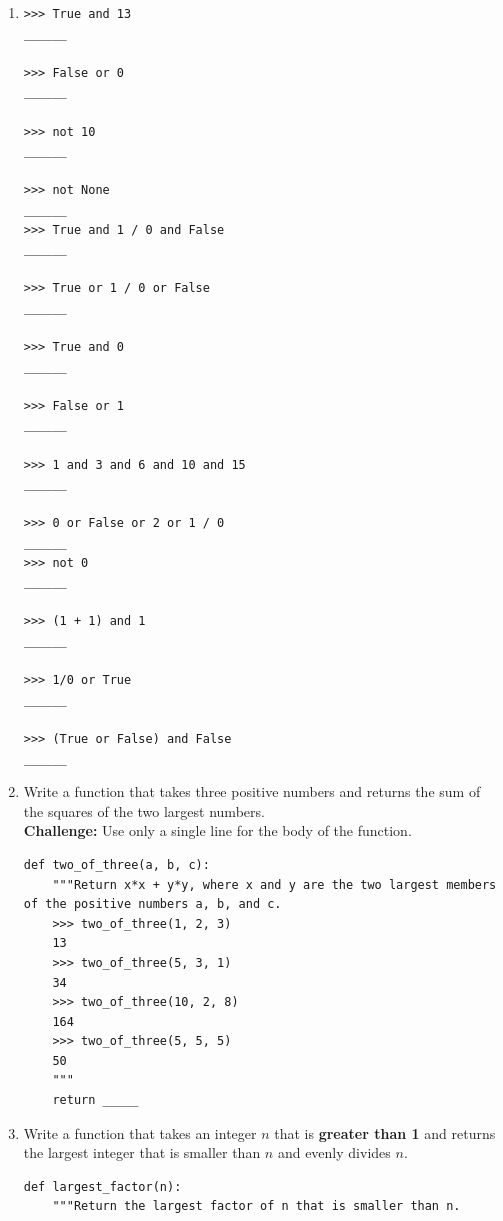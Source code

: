 \documentclass[11pt]{article}
\begin{document}
\begin{enumerate}[leftmargin = *]
\item
\begin{lstlisting}
>>> True and 13
______

>>> False or 0
______

>>> not 10
______

>>> not None
______
>>> True and 1 / 0 and False
______

>>> True or 1 / 0 or False
______

>>> True and 0
______

>>> False or 1
______

>>> 1 and 3 and 6 and 10 and 15
______

>>> 0 or False or 2 or 1 / 0
______
>>> not 0
______

>>> (1 + 1) and 1
______

>>> 1/0 or True
______

>>> (True or False) and False
______

\end{lstlisting}
\item Write a function that takes three positive numbers and returns the sum of the squares of the two largest numbers. \\
\textbf{Challenge:} Use only a single line for the body of the function.  
\begin{lstlisting}
def two_of_three(a, b, c):
    """Return x*x + y*y, where x and y are the two largest members of the positive numbers a, b, and c.
    >>> two_of_three(1, 2, 3)
    13
    >>> two_of_three(5, 3, 1)
    34
    >>> two_of_three(10, 2, 8)
    164
    >>> two_of_three(5, 5, 5)
    50
    """
    return _____
\end{lstlisting}
\item Write a function that takes an integer $n$ that is \textbf{greater than 1} and returns the largest integer that is smaller than $n$ and evenly divides $n$. 
\begin{lstlisting}
def largest_factor(n):
    """Return the largest factor of n that is smaller than n.


\end{lstlisting}
\end{enumerate}
\end{document}
